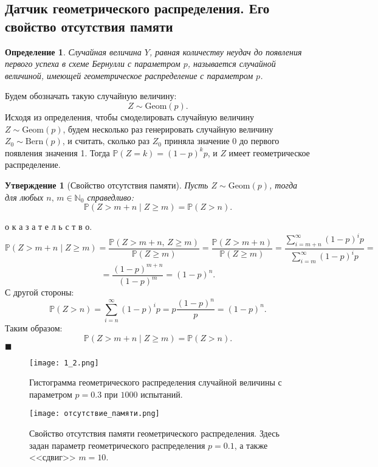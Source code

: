 \documentclass[a4paper, 11pt]{article}
\theoremstyle{def}
\newtheorem{definition}{Определение}[section]
\theoremstyle{th}
\newtheorem{assertion}{Утверждение}[section]
\theoremstyle{rem}
\renewenvironment{proof}{\parД о к а з а т е л ь с т в о.}{\hfill$\blacksquare$}
\newcommand{\p}{\mathbb{P}}
\newcommand{\N}{\mathbb{N}}
\begin{document}
\subsection{Датчик геометрического распределения. Его свойство отсутствия памяти}
\begin{definition}
    Случайная величина $Y$, равная количеству неудач до появления первого успеха в схеме Бернулли с параметром $p$, называется \textit{случайной величиной, имеющей геометрическое распределение с параметром $p$}.    
\end{definition}
Будем обозначать такую случайную величину:
$$
    Z \sim \mbox{Geom}(p).
$$
Исходя из определения, чтобы смоделировать случайную величину $Z \sim \mbox{Geom}(p)$, будем несколько раз генерировать случайную величину $Z_0 \sim \mbox{Bern}(p)$, и считать, сколько раз $Z_0$ приняла значение 0 до первого появления значения 1. Тогда $\p(Z=k) = (1-p)^k p$, и $Z$ имеет геометрическое распределение.
\begin{assertion}[Свойство отсутствия памяти]
        Пусть $Z\sim\mbox{Geom}(p)$, тогда для любых $n,\,m\in\N_0$ справедливо:
        $$
                \p(Z > m + n\;|\;Z\geqslant m) = \p(Z> n).
        $$
\end{assertion}
\begin{proof}
        $$
                \p(Z > m+n\;|\;Z\geqslant m)=
                \frac{\p(Z > m + n,\,Z\geqslant m)}{\p(Z\geqslant m)}= \frac{\p(Z > m+ n)}{\p(Z\geqslant m)}=
                \frac{\sum_{i=m+n}^{\infty}(1-p)^ip}{\sum_{i=m}^{\infty}(1-p)^ip}=
        $$
        $$
                = \frac{(1-p)^{m+n}}{(1-p)^m}=
                (1-p)^n.
        $$
        С другой стороны:
        $$
                \p(Z > n) = \sum_{i=n}^{\infty}(1-p)^ip =
                p\frac{(1-p)^n}{p} = (1-p)^n.
        $$
        Таким образом:
        $$
        \p(Z > m + n\;|\;Z\geqslant m) = \p(Z> n).
        $$
\end{proof}
\begin{figure}[h]
        \centering
        \texttt{[image: 1\_2.png]}
        \caption{Гистограмма геометрического распределения случайной величины с параметром $p = 0.3$ при $1000$ испытаний.}
\end{figure}
\begin{figure}[H]
        \noindent
        \centering
        \texttt{[image: отсутствие\_памяти.png]}
        \caption{Свойство отсутствия памяти геометрического распределения. Здесь задан параметр геометрического распределения $p = 0.1$, а также <<сдвиг>> $m = 10$.}
\end{figure}
\end{document}
